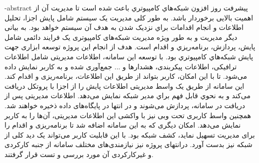 
\fa-abstract{
    پیشرفت روز افزون شبکه‌هاي کامپیوتري باعث شده است تا مدیریت آن از اهمیت بالایی برخوردار باشد. به طور کلی مدیریت یک سیستم شامل پایش اجزا، تحلیل اطلاعات و انجام اقدامات براي نزدیک شدن به هدف آن سیستم خواهد بود. به بیانی دیگر مدیریت و به طور ویژه مدیریت شبکه‌های کامپیوتری یک فرایند دائمی شامل پایش، پردازش، برنامه‌ریزي و اقدام است. هدف از انجام این پروژه توسعه ابزاری جهت پایش شبکه‌هاي کامپیوتري بود. با توسعه این سامانه، اطلاعات مدیریتی شامل اطلاعات ترافیکی، اطلاعات پیکربندی، هشدارها و ... جمع‌آوری شده و به کاربر نمایش داده می‌شود. تا با این امکان، کاربر بتواند از طریق این اطلاعات، برنامه‌ریزی و اقدام کند. این سامانه از طریق یک واسط مدیریتی اطلاعات پایش را از اجزا با پروتکل  دریافت می‌کند و به نحوي قابل فهم براي مدیر شبکه نمایش می‌دهد. اطلاعات مدیریتی پس از دریافت در سامانه، پردازش می‌شوند و در انتها در پایگاه‌های داده ذخیره خواهند شد. همچنین واسط کاربری تحت وبی نیز با واکشی این اطلاعات مدیریتی، آن‌ها را به کاربر نمایش می‌دهد. امکان دیگری که به این سامانه اضافه شد تا برنامه‌ریزی و اقدام را برای مدیریت تسهیل نماید، کشف شبکه بود. با این قابلیت کاربر می‌تواند یک دید کلی از شبکه نیز بدست آورد. درانتهای پروژه نیز نیازمندی‌های مختلف سامانه از جنبه کارکردی و غیرکارکردی آن مورد بررسی و تست قرار گرفتند.
    }


